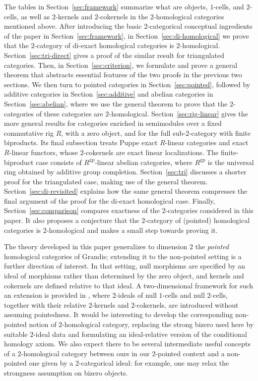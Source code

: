 \documentclass[11pt,reqno,a4paper]{amsart}
\theoremstyle{definition}
\theoremstyle{remark}
\newcommand{\0}{\mathbf{0}}
\renewcommand{\1}{\mathbf{1}}
\begin{document}
The tables in Section~\ref{sec:framework} summarize what are objects, $1$-cells, and $2$-cells, as well as $2$-kernels and $2$-cokernels in the $2$-homological categories mentioned above. After introducing the basic $2$-categorical conceptual ingredients of the paper in Section~\ref{sec:framework}, in
Section~\ref{sec:di-homological} we prove that the $2$-category of di-exact homological categories is $2$-homological.
Section~\ref{sec:tri-direct} gives a proof of the similar result for triangulated
categories. Then, in Section~\ref{sec:criterion}, we formulate and prove
a general theorem that abstracts essential features of the two proofs in the previous two sections.
We then turn to pointed categories in Section~\ref{sec:pointed},
followed by additive categories in Section~\ref{sec:additive} and
abelian categories in Section~\ref{sec:abelian}, where we use the general theorem to prove that the $2$-categories of these categories are $2$-homological. Section~\ref{sec:rig-linear} gives the more general results for categories enriched in semimodules over a fixed commutative rig $R$, with a zero object, and for the full sub-$2$-category with finite biproducts. Its final subsection treats Puppe exact $R$-linear categories and exact $R$-linear functors, whose $2$-cokernels are exact linear localizations. The finite-biproduct case consists of $R^{\mathrm{gp}}$-linear abelian categories, where $R^{\mathrm{gp}}$ is the universal ring obtained by additive group completion. 
Section~\ref{sec:tri} discusses a shorter proof for the triangulated case, making use of the general theorem.
Section~\ref{sec:di-revisited} explains how the same general theorem compresses
the final argument of the proof for the di-exact homological case. Finally, Section~\ref{sec:comparison} compares exactness of the $2$-categories considered in this paper. It also proposes a conjecture that the $2$-category of (pointed) homological categories is $2$-homological and makes a small step towards proving it.

The theory developed in this paper generalizes to dimension $2$ the
\emph{pointed} homological categories of Grandis; extending it to the
non-pointed setting is a further direction of interest. In that setting,
null morphisms are specified by an ideal of morphisms rather than determined by the zero
object, and kernels and cokernels are defined relative to that ideal.
A two-dimensional framework for such an extension is provided in \cite{CJM}, where $2$-ideals of null
$1$-cells and null $2$-cells, together with their relative $2$-kernels
and $2$-cokernels, are introduced without assuming pointedness. It would be interesting
to develop the corresponding non-pointed notion of $2$-homological
category, replacing the strong bizero used here by suitable $2$-ideal
data and formulating an ideal-relative version of the conditional
homology axiom. We also expect there to be several intermediate useful concepts of a $2$-homological category between ours in our $2$-pointed context and a non-pointed one given by a $2$-categorical ideal: for example, one may relax the strongness assumption on bizero objects.
\end{document}
